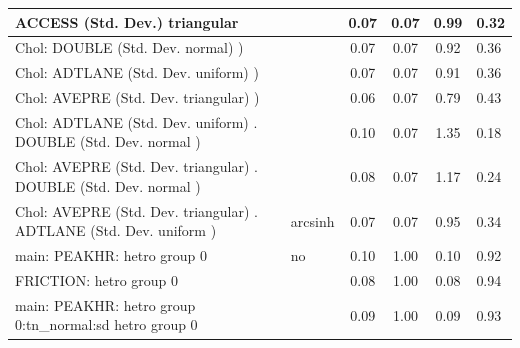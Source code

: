 \begin{table}
\begin{center}
\begin{tabular}{|l|l|c|c|c|l|}
			\hline
			ACCESS (Std. Dev.) triangular &  & 0.07 & 0.07 & 0.99 & 0.32 \\
			\hline
			 Chol: DOUBLE (Std. Dev. normal) ) &  & 0.07 & 0.07 & 0.92 & 0.36 \\
			\hline
			 Chol: ADTLANE (Std. Dev. uniform) ) &  & 0.07 & 0.07 & 0.91 & 0.36 \\
			\hline
			 Chol: AVEPRE (Std. Dev. triangular) ) &  & 0.06 & 0.07 & 0.79 & 0.43 \\
			\hline
			 Chol: ADTLANE (Std. Dev. uniform) . DOUBLE (Std. Dev.   normal ) &  & 0.10 & 0.07 & 1.35 & 0.18 \\
			\hline
			 Chol: AVEPRE (Std. Dev. triangular) . DOUBLE (Std. Dev.   normal ) &  & 0.08 & 0.07 & 1.17 & 0.24 \\
			\hline
			 Chol: AVEPRE (Std. Dev. triangular) . ADTLANE (Std. Dev.   uniform ) & arcsinh & 0.07 & 0.07 & 0.95 & 0.34 \\
			\hline
			main: PEAKHR: hetro group 0 & no & 0.10 & 1.00 & 0.10 & 0.92 \\
			\hline
			FRICTION: hetro group 0 &  & 0.08 & 1.00 & 0.08 & 0.94 \\
			\hline
			main: PEAKHR: hetro group 0:tn_normal:sd  hetro group 0 &  & 0.09 & 1.00 & 0.09 & 0.93 \\
			\hline
		\end{tabular}
	\end{center}
\end{table}